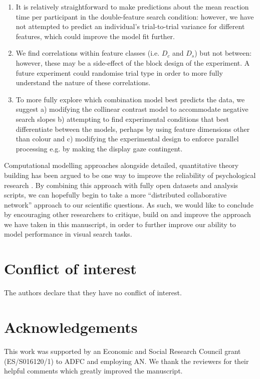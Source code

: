 \documentclass[preprint,12pt,authoryear]{elsarticle}
\begin{document}
\begin{enumerate}
\item It is relatively straightforward to make predictions about the mean reaction time per participant in the double-feature search condition: however, we have not  attempted to predict an individual's trial-to-trial variance for different features, which could improve the model fit further.
\\
\item We find correlations within feature classes (i.e. $D_c$ and $D_s$) but not between: however, these may be a side-effect of the block design of the experiment. A future experiment could randomise trial type in order to more fully understand the nature of these correlations.
\\
\item To more fully explore which combination model best predicts the data, we suggest a) modifying the collinear contrast model to accommodate negative search slopes b) attempting to find experimental conditions that best differentiate between the models, perhaps by using feature dimensions other than colour and c) modifying the experimental design to enforce parallel processing e.g. by making the display gaze contingent.
\end{enumerate}

Computational modelling approaches alongside detailed, quantitative theory building has been argued to be one way to improve the reliability of psychological research \citep{oberauer2019addressing, guest2021computational}. By combining this approach with fully open datasets and analysis scripts, we can hopefully begin to take a more ``distributed collaborative network'' approach \citep{moshontz2018psychological} to our scientific questions. As such, we would like to conclude by encouraging other researchers to critique, build on and improve the approach we have taken in this manuscript, in order to further improve our ability to model performance in visual search tasks. 

%
\section*{Conflict of interest}
The authors declare that they have no conflict of interest.

\section*{Acknowledgements}
This work was supported by an Economic and Social Research Council grant (ES/S016120/1) to ADFC and employing AN. We thank the reviewers for their helpful comments which greatly improved the manuscript.

\end{document}
